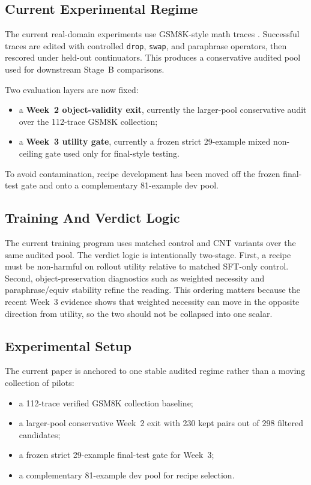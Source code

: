 \subsection{Current Experimental Regime}

The current real-domain experiments use GSM8K-style math traces \citep{cobbe2021gsm8k}. Successful traces are edited with controlled \texttt{drop}, \texttt{swap}, and paraphrase operators, then rescored under held-out continuators. This produces a conservative audited pool used for downstream Stage~B comparisons.

Two evaluation layers are now fixed:

\begin{itemize}
  \item a \textbf{Week~2 object-validity exit}, currently the larger-pool conservative audit over the 112-trace GSM8K collection;
  \item a \textbf{Week~3 utility gate}, currently a frozen strict 29-example mixed non-ceiling gate used only for final-style testing.
\end{itemize}

To avoid contamination, recipe development has been moved off the frozen final-test gate and onto a complementary 81-example dev pool.

\subsection{Training And Verdict Logic}

The current training program uses matched control and CNT variants over the same audited pool. The verdict logic is intentionally two-stage. First, a recipe must be non-harmful on rollout utility relative to matched SFT-only control. Second, object-preservation diagnostics such as weighted necessity and paraphrase/equiv stability refine the reading. This ordering matters because the recent Week~3 evidence shows that weighted necessity can move in the opposite direction from utility, so the two should not be collapsed into one scalar.

\subsection{Experimental Setup}

The current paper is anchored to one stable audited regime rather than a moving collection of pilots:

\begin{itemize}
  \item a 112-trace verified GSM8K collection baseline;
  \item a larger-pool conservative Week~2 exit with 230 kept pairs out of 298 filtered candidates;
  \item a frozen strict 29-example final-test gate for Week~3;
  \item a complementary 81-example dev pool for recipe selection.
\end{itemize}

